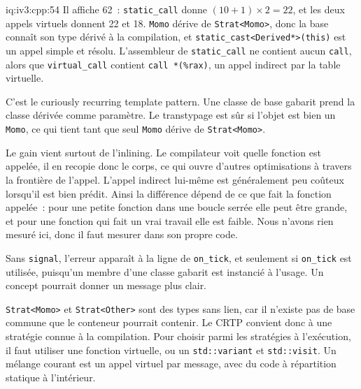 \begin{solution}{iq:iv3:cpp:54}
Il affiche 62~: \texttt{static\_call} donne $(10 + 1) \times 2 = 22$, et les deux appels virtuels donnent 22 et 18. \texttt{Momo} dérive de \texttt{Strat<Momo>}, donc la base connaît son type dérivé à la compilation, et \texttt{static\_cast<Derived*>(this)} est un appel simple et résolu. L'assembleur de \texttt{static\_call} ne contient aucun \texttt{call}, alors que \texttt{virtual\_call} contient \texttt{call *(\%rax)}, un appel indirect par la table virtuelle.

C'est le curiously recurring template pattern. Une classe de base gabarit prend la classe dérivée comme paramètre. Le transtypage est sûr si l'objet est bien un \texttt{Momo}, ce qui tient tant que seul \texttt{Momo} dérive de \texttt{Strat<Momo>}.

Le gain vient surtout de l'inlining. Le compilateur voit quelle fonction est appelée, il en recopie donc le corps, ce qui ouvre d'autres optimisations à travers la frontière de l'appel. L'appel indirect lui-même est généralement peu coûteux lorsqu'il est bien prédit. Ainsi la différence dépend de ce que fait la fonction appelée~: pour une petite fonction dans une boucle serrée elle peut être grande, et pour une fonction qui fait un vrai travail elle est faible. Nous n'avons rien mesuré ici, donc il faut mesurer dans son propre code.

Sans \texttt{signal}, l'erreur apparaît à la ligne de \texttt{on\_tick}, et seulement si \texttt{on\_tick} est utilisée, puisqu'un membre d'une classe gabarit est instancié à l'usage. Un concept pourrait donner un message plus clair.

\texttt{Strat<Momo>} et \texttt{Strat<Other>} sont des types sans lien, car il n'existe pas de base commune que le conteneur pourrait contenir. Le CRTP convient donc à une stratégie connue à la compilation. Pour choisir parmi les stratégies à l'exécution, il faut utiliser une fonction virtuelle, ou un \texttt{std::variant} et \texttt{std::visit}. Un mélange courant est un appel virtuel par message, avec du code à répartition statique à l'intérieur.

\end{solution}

